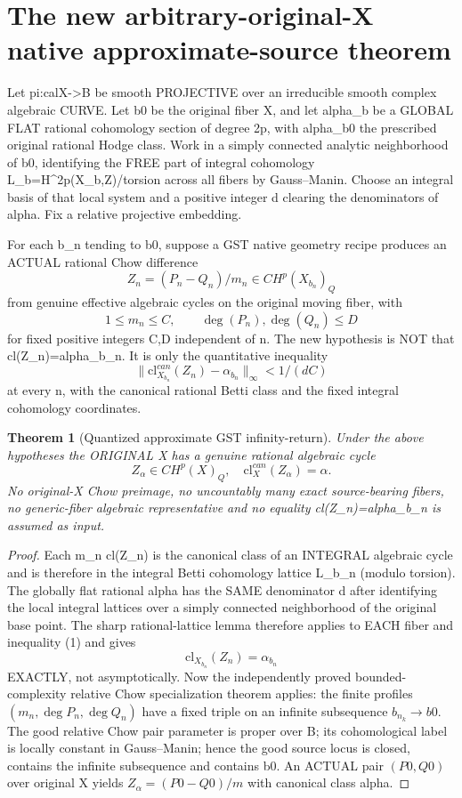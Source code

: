 \documentclass{article}
\newtheorem{theorem}{Theorem}
\begin{document}
\section{The new arbitrary-original-X native approximate-source theorem}
Let pi:calX->B be smooth PROJECTIVE over an irreducible smooth
complex algebraic CURVE. Let b0 be the original fiber X, and
let alpha_b be a GLOBAL FLAT rational cohomology section of
degree 2p, with alpha_b0 the prescribed original rational Hodge
class. Work in a simply connected analytic neighborhood
of b0, identifying the FREE part of integral cohomology
L_b=H^{2p}(X_b,Z)/torsion across all fibers by Gauss--Manin.
Choose an integral basis of that local system and a
positive integer d clearing the denominators of alpha.
Fix a relative projective embedding.

For each b_n tending to b0, suppose a GST native geometry
recipe produces an ACTUAL rational Chow difference
\[
Z_n=(P_n-Q_n)/m_n\in CH^p(X_{b_n})_Q
\]
from genuine effective algebraic cycles on the original
moving fiber, with
\[
1\le m_n\le C,\qquad
\deg(P_n),\deg(Q_n)\le D
\]
for fixed positive integers C,D independent of n.
The new hypothesis is NOT that cl(Z_n)=alpha_b_n.
It is only the quantitative inequality
\[
\boxed{
\|\mathrm{cl}^{can}_{X_{b_n}}(Z_n)-\alpha_{b_n}\|_\infty
<1/(dC)
}
\tag{1}
\]
at every n, with the canonical rational Betti class and
the fixed integral cohomology coordinates.

\begin{theorem}[Quantized approximate GST infinity-return]
Under the above hypotheses the ORIGINAL X has a
genuine rational algebraic cycle
\[
\boxed{Z_\alpha\in CH^p(X)_Q,\quad
\mathrm{cl}^{can}_X(Z_\alpha)=\alpha.}
\]
No original-X Chow preimage, no uncountably many exact
source-bearing fibers, no generic-fiber algebraic
representative and no equality cl(Z_n)=alpha_b_n
is assumed as input.
\end{theorem}
\begin{proof}
Each m_n cl(Z_n) is the canonical class of an
INTEGRAL algebraic cycle and is therefore in the
integral Betti cohomology lattice L_b_n
(modulo torsion). The globally flat rational alpha
has the SAME denominator d after identifying the
local integral lattices over a simply connected
neighborhood of the original base point.
The sharp rational-lattice lemma therefore applies
to EACH fiber and inequality (1) and gives
\[
\mathrm{cl}_{X_{b_n}}(Z_n)=\alpha_{b_n}
\]
EXACTLY, not asymptotically.
Now the independently proved bounded-complexity
relative Chow specialization theorem applies:
the finite profiles $(m_n,\deg P_n,\deg Q_n)$
have a fixed triple on an infinite subsequence
$b_{n_k}\to b0$. The good relative Chow pair
parameter is proper over B; its cohomological
label is locally constant in Gauss--Manin;
hence the good source locus is closed, contains
the infinite subsequence and contains b0.
An ACTUAL pair $(P0,Q0)$ over original X yields
$Z_\alpha=(P0-Q0)/m$ with canonical class alpha.
\end{proof}
\end{document}
